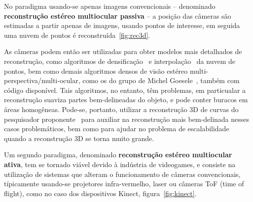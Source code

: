 No paradigma usando-se apenas imagens convencionais -- denominado
\textbf{reconstrução estéreo multiocular passiva} --  a posição das câmeras são
estimadas a partir apenas de imagens, usando pontos de interesse, em seguida uma
nuvem de pontos é reconstruída~\ref{fig:rec3d}.


As câmeras podem então ser
utilizadas para obter modelos mais detalhados de reconstrução, como algoritmos
de densificação~\cite{Furukawa:Ponce:CVPR2007} e interpolação~\cite{poisson} da nuvem de pontos,
bem como demais algoritmos densos de visão estéreo
multi-perspectiva/multi-ocular, como os do grupo de Michel Goesele~\cite{Goesele:MVE:2014},
também com código disponível. Tais algoritmos, no entanto, têm problemas, em
particualar a reconstrução suaviza partes bem-delineadas do objeto, e pode
conter buracos em áreas homogêneas. Pode-se, portanto, utilizar a reconstrução
3D de curvas do pesquisador proponente~\cite{Usumezbas:Fabbri:Kimia:ECCV16,Fabbri:Kimia:IJCV2016,Fabbri:Kimia:CVPR10,Fabbri:Giblin:Kimia:ECCV12} para auxiliar na
reconstrução mais bem-delinada nesses casos problemáticos, bem como para ajudar
no problema de escalabilidade quando a reconstrução 3D se torna muito grande.

Um segundo paradigma, denominado \textbf{reconstrução estéreo multiocular
ativa}, tem se tornado viável devido à indústria de videogames, e consiste na
utilização de sistemas que alteram o funcionamento de câmeras convencionais,
típicamente usando-se projetores infra-vermelho, laser ou câmeras ToF (time of
flight), como no caso dos dispositivos Kinect, figura~\ref{fig:kinect}. 


